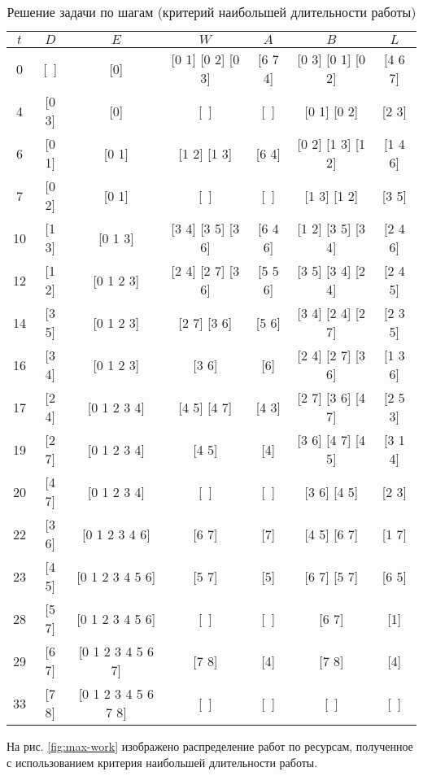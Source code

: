 \begin{table}[H]
	\centering
	\def\tabcolsep{5pt}
	\def\arraystretch{1.3}
	\caption{Решение задачи по шагам (критерий наибольшей длительности работы)}
	\label{tab:max-work}
	\begin{tabular}{|c|c|c|c|c|c|c|}
		\hline
		$t$ & $D$ & $E$ & $W$ & $A$ & $B$ & $L$ \\ \hline
		0 & [~] & [0] & [0 1] [0 2] [0 3] & [6 7 4] & [0 3] [0 1] [0 2] & [4 6 7] \\ \hline
		4 & [0 3] & [0] & [~] & [~] & [0 1] [0 2] & [2 3] \\ \hline
		6 & [0 1] & [0 1] & [1 2] [1 3] & [6 4] & [0 2] [1 3] [1 2] & [1 4 6] \\ \hline
		7 & [0 2] & [0 1] & [~] & [~] & [1 3] [1 2] & [3 5] \\ \hline
		10 & [1 3] & [0 1 3] & [3 4] [3 5] [3 6] & [6 4 6] & [1 2] [3 5] [3 4] & [2 4 6] \\ \hline
		12 & [1 2] & [0 1 2 3] & [2 4] [2 7] [3 6] & [5 5 6] & [3 5] [3 4] [2 4] & [2 4 5] \\ \hline
		14 & [3 5] & [0 1 2 3] & [2 7] [3 6] & [5 6] & [3 4] [2 4] [2 7] & [2 3 5] \\ \hline
		16 & [3 4] & [0 1 2 3] & [3 6] & [6] & [2 4] [2 7] [3 6] & [1 3 6] \\ \hline
		17 & [2 4] & [0 1 2 3 4] & [4 5] [4 7] & [4 3] & [2 7] [3 6] [4 7] & [2 5 3] \\ \hline
		19 & [2 7] & [0 1 2 3 4] & [4 5] & [4] & [3 6] [4 7] [4 5] & [3 1 4] \\ \hline
		20 & [4 7] & [0 1 2 3 4] & [~] & [~] & [3 6] [4 5] & [2 3] \\ \hline
		22 & [3 6] & [0 1 2 3 4 6] & [6 7] & [7] & [4 5] [6 7] & [1 7] \\ \hline
		23 & [4 5] & [0 1 2 3 4 5 6] & [5 7] & [5] & [6 7] [5 7] & [6 5] \\ \hline
		28 & [5 7] & [0 1 2 3 4 5 6] & [~] & [~] & [6 7] & [1] \\ \hline
		29 & [6 7] & [0 1 2 3 4 5 6 7] & [7 8] & [4] & [7 8] & [4] \\ \hline
		33 & [7 8] & [0 1 2 3 4 5 6 7 8] & [~] & [~] & [~] & [~] \\ \hline
	\end{tabular}
\end{table}

\newpage

На рис. \ref{fig:max-work} изображено распределение работ по ресурсам, полученное с использованием критерия наибольшей длительности работы.

